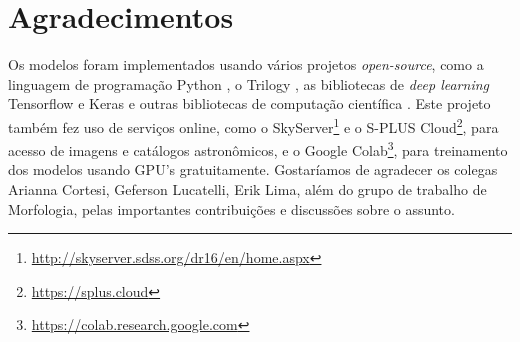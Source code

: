 \section{Agradecimentos}
Os modelos foram implementados usando vários projetos \emph{open-source}, como a linguagem de programação Python \cite{python}, o Trilogy \cite{trilogy}, as bibliotecas de \emph{deep learning} Tensorflow \cite{tensorflow} e Keras \cite{keras} e outras bibliotecas de computação científica \cite{astropy, sklearn, skimg, numpy, scipy, ipython, pandas, matplotlib}. Este projeto também fez uso de serviços online, como o SkyServer\footnote{\url{http://skyserver.sdss.org/dr16/en/home.aspx}} e o S-PLUS Cloud\footnote{\url{https://splus.cloud}}, para acesso de imagens e catálogos astronômicos, e o Google Colab\footnote{\url{https://colab.research.google.com}}, para treinamento dos modelos usando GPU's gratuitamente. Gostaríamos de agradecer os colegas Arianna Cortesi, Geferson Lucatelli, Erik Lima, além do grupo de trabalho de Morfologia, pelas importantes contribuições e discussões sobre o assunto.
